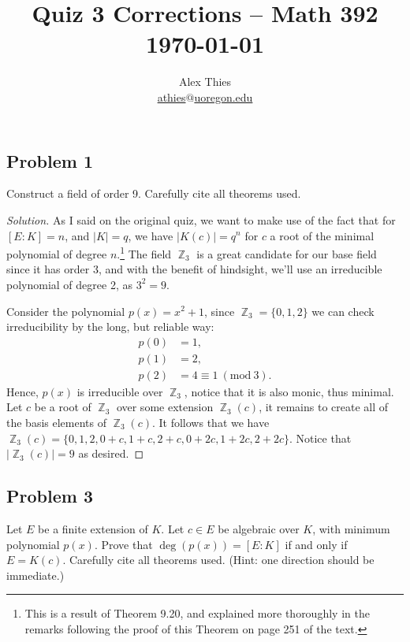 \documentclass[letterpaper, 12pt]{amsart}
\DeclareMathOperator{\Z}{\mathbb{Z}}
\renewcommand{\mod}[1]{\ (\mathrm{mod}\ #1)}
\begin{document}
	\title{Quiz 3 Corrections  -- Math 392 \\ \today}
	\author{Alex Thies \\ \href{mailto:athies@uoregon.edu}{\lowercase{athies$@$uoregon.edu}}}

	\maketitle

	\subsection*{Problem 1}
	\label{sub:problem_1}
	Construct a field of order 9.
	Carefully cite all theorems used.

	\begin{proof}[Solution]
		As I said on the original quiz, we want to make use of the fact that for $[E:K] = n$, and $|K| = q$, we have $|K(c)| = q^{n}$ for $c$ a root of the minimal polynomial of degree $n$.\footnote{This is a result of Theorem 9.20, and explained more thoroughly in the remarks following the proof of this Theorem on page 251 of the text.}
		The field $\Z_{3}$ is a great candidate for our base field since it has order 3, and with the benefit of hindsight, we'll use an irreducible polynomial of degree 2, as $3^2 = 9$.

		Consider the polynomial $p(x) = x^{2} + 1$, since $\Z_{3} = \{0,1,2\}$ we can check irreducibility by the long, but reliable way:
			\begin{align*}
			p(0) &= 1, \\
			p(1) &= 2, \\
			p(2) &= 4 \equiv 1 \mod{3}.
			\end{align*}
		Hence, $p(x)$ is irreducible over $\Z_{3}$, notice that it is also monic, thus minimal.
		Let $c$ be a root of $\Z_{3}$ over some extension $\Z_{3}(c)$, it remains to create all of the basis elements of $\Z_{3}(c)$.
		It follows that we have $\Z_{3}(c) = \{ 0, 1, 2, 0 + c, 1 + c, 2 + c, 0 + 2c, 1 + 2c, 2 + 2c \}$.
		Notice that $|\Z_{3}(c)| = 9$ as desired.
	\end{proof}

	\subsection*{Problem 3}
	\label{sub:problem_3}
	Let $E$ be a finite extension of $K$.
	Let $c \in E$ be algebraic over $K$, with minimum polynomial $p(x)$.
	Prove that $\deg(p(x)) = [E:K]$ if and only if $E = K(c)$.
	Carefully cite all theorems used.
	(Hint: one direction should be immediate.)
\end{document}
